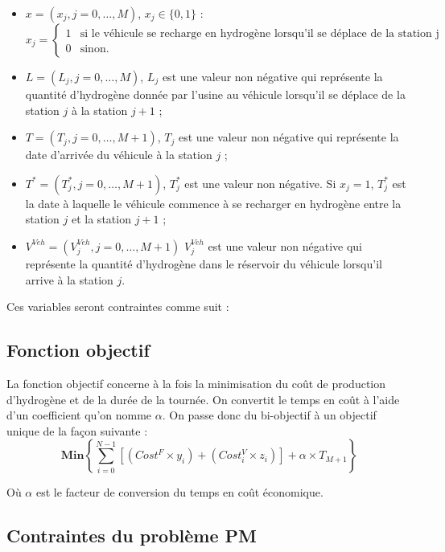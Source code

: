 \begin{enumerate}
	\begin{itemize}[label=$\square$]
		\item $x=(x_j, j = 0, \dots, M)$,  $x_j \in \{0,1\} $ :
		$$
		x_j= \left\{
		\begin{array}{ll}
		1 & \mbox{si le véhicule se recharge en hydrogène lorsqu'il se déplace de la station j à la station j + 1} \\
		0 & \mbox{sinon.}
		\end{array}
		\right.
		$$
		\item $L = (L_j, j=0, \dots, M)$, $L_j$ est une valeur non négative qui représente la quantité d'hydrogène donnée par l'usine au véhicule lorsqu'il se déplace de la station $j$ à la station $j + 1$ ;
		
		\item $T= (T_j, j=0, \dots, M+1)$, $T_j$ est une valeur non négative qui représente la date d'arrivée du véhicule à la station $j$ ;
		\item $T^*= (T^*_j, j=0, \dots, M+1)$, $T^*_j$ est une valeur non négative. Si $x_j=1$, $T^*_j$ est la date à laquelle le véhicule commence à se recharger en hydrogène entre la station $j$ et la station $j + 1$ ;
		
		\item $V^{Veh} = (V^{Veh}_j, j=0, \dots, M+1)$ $V^{Veh}_j$ est une valeur non négative qui représente la quantité d'hydrogène dans le réservoir du véhicule lorsqu'il arrive à la station $j$.
	\end{itemize}
	
\end{enumerate}
Ces variables seront contraintes comme suit :
\subsection{Fonction objectif}

La fonction objectif concerne à la fois la minimisation du coût de production d'hydrogène et de la durée de la tournée. On convertit le temps en coût à l'aide d'un coefficient qu'on nomme $\alpha$. On passe donc du bi-objectif à un objectif unique de la façon suivante :
\begin{equation}
\label{Fonction_obj}
\textbf{Min}
\left\{
\sum_{i=0}^{N-1}[(Cost^F \times y_i) + (Cost_i^V \times z_i)]+ \alpha \times T_{M+1}
\right\}
\end{equation}

Où $\alpha$ est le facteur de conversion du temps en coût économique.
\subsection{Contraintes du problème PM}

